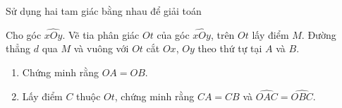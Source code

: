 \begin{dang}{Sử dụng hai tam giác bằng nhau để giải toán} \end{dang}

\setcounter{vd}{0}

\begin{vd}%
	Cho góc $ \widehat{xOy} $. Vẽ tia phân giác $ Ot $ của góc $ \widehat{xOy} $, trên $ Ot $ lấy điểm $ M $. Đường thẳng $ d $ qua $ M $ và vuông với $ Ot $ cắt $ Ox $, $ Oy $ theo thứ tự tại $ A $ và $ B $. \begin{enumerate}
		\item Chứng minh rằng $ OA = OB $.
		\item Lấy điểm $ C $ thuộc $ Ot $, chứng minh rằng $ CA=CB $ và $ \widehat{OAC}=\widehat{OBC} $.
	\end{enumerate} 
\end{vd}
